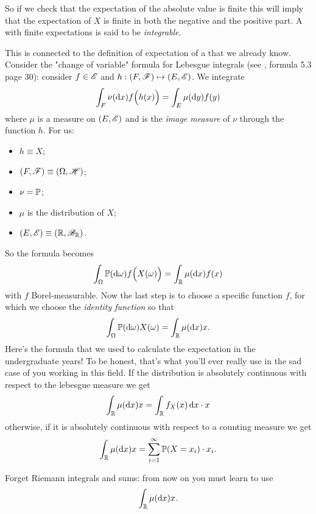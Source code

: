\documentclass{report}
\begin{document}
So if we check that the expectation of the absolute value is finite this will imply that the expectation of $X$ is finite in both the negative and the positive part. A \rv{} with finite expectations is said to be \emph{integrable}.
\begin{remark}\label{eh}
	This is connected to the definition of expectation of a \rv{} that we already know. Consider the "change of variable" formula for Lebesgue integrals (see \cinlar, formula 5.3 page 30): consider $f\in\mathscr{E}$ and $h:(F,\mathscr{F})\mapsto(E,\mathscr{E})$. We integrate
	\[\int_F\nu(\mathop{}\!\mathrm{d} x)f\Big(h(x)\Big)=\int_E\mu(\mathop{}\!\mathrm{d} y)f(y)\]
	where $\mu$ is a measure on $(E,\mathscr{E})$ and is the \textit{image measure} of $\nu$ through the function $h$. For us:
	\begin{itemize}
		\item $h\equiv X$;
		\item $(F,\mathscr{F})\equiv(\Omega,\mathscr{H})$;
		\item $\nu=\mathbb{P}$;
		\item $\mu$ is the distribution of $X$;
		\item $(E,\mathscr{E})\equiv(\mathbb{R},\mathscr{B}_{\mathbb{R}})$.
	\end{itemize}
	So the formula becomes
	\[\int_\Omega\mathbb{P}(\mathop{}\!\mathrm{d}\omega)f\Big(X(\omega)\Big)=\int_{\mathbb{R}}\mu(\mathop{}\!\mathrm{d} x)f(x)\]
	with $f$ Borel-measurable. Now the last step is to choose a specific function $f$, for which we choose the \textit{identity function} so that
	\[\int_\Omega\mathbb{P}(\mathop{}\!\mathrm{d}\omega)X(\omega)=\int_{\mathbb{R}}\mu(\mathop{}\!\mathrm{d} x)x.\]
	Here's the formula that we used to calculate the expectation in the undergraduate years! To be honest, that's what you'll ever really use in the sad case of you working in this field. If the distribution is absolutely continuous with respect to the lebesgue measure we get
	\[\int_{\mathbb{R}}\mu(\mathop{}\!\mathrm{d} x)x=\int_{\mathbb{R}}f_X(x)\mathop{}\!\mathrm{d} x\cdot x\]
	otherwise, if it is absolutely continuous with respect to a counting measure we get
	\[\int_{\mathbb{R}}\mu(\mathop{}\!\mathrm{d} x)x=\sum_{i=1}^{\infty}\mathbb{P}(X=x_i)\cdot x_i.\]
	\begin{notation}
		Forget Riemann integrals and sums: from now on you must learn to use 
		\[\int_{\mathbb{R}}\mu(\mathop{}\!\mathrm{d} x)x.\]
	\end{notation}
\end{remark}
\end{document}
